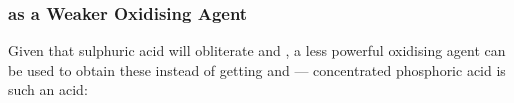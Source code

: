 


			\subsubsection{\texorpdfstring{}{H₃PO₄} as a Weaker Oxidising Agent}

				Given that sulphuric acid will obliterate  and , a less powerful oxidising agent can be used to obtain these
				instead of getting  and  --- concentrated phosphoric acid is such an acid:





















